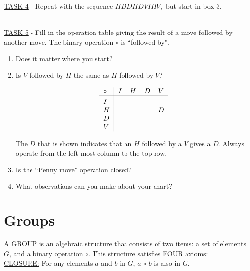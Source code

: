 \documentclass[12pt]{book}
\theoremstyle{definition}
\begin{document}
\underline{TASK 4} - Repeat with the sequence $ H D D H D V I H V, $ but start in box 3.

~\\

\underline{TASK 5} - Fill in the operation table giving the result of a move followed by another move. The binary operation $ \circ $ is ``followed by".

\begin{enumerate}[label=(\alph*)]
	\item Does it matter where you start?
	
	\item Is $ V $ followed by $ H $ the same as $ H $ followed by $ V $?
	
	\begin{center}
		\[
		\begin{tabular}{>{$}l<{$}|*{4}{>{$}l<{$}}}
		\circ   & I  & H   & D & V      \\
		\hline\vrule height 12pt width 0pt
		I   & ~   & ~  & ~  & ~      \\
		H   & ~   & ~   & ~   & D      \\
		D   & ~   & ~   & ~   & ~         \\
		V   & ~   & ~   & ~   & ~      \\
		
		\end{tabular} 
		\]
	\end{center}
	
	The $ D $ that is shown indicates that an $ H $ followed by a $ V $ gives a $ D $. Always operate from the left-most column to the top row. 
	
	\item  Is the ``Penny move" operation closed?
	
	\item What observations can you make about your chart?
\end{enumerate}
\section{Groups}
 A GROUP is an algebraic structure that consists of two items: a set of elements $G$, and a binary operation $\circ$.  This structure satisfies FOUR axioms:\\

\underline{CLOSURE:} For any elements $a$ and $b$ in $G$, $a\,\circ\,b$ is also in $G$.\\
\end{document}
